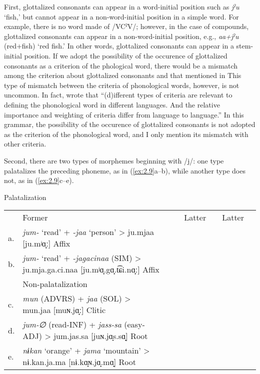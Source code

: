 First, glottalized consonants can appear in a word-initial position such as \textit{jˀu} ‘fish,’ but cannot appear in a non-word-initial position in a simple word. For example, there is no word made of /VCˀV/; however, in the case of compounds, glottalized consonants can appear in a non-word-initial position, e.g., \textit{aa+jˀu} (red+fish) ‘red fish.’ In other words, glottalized consonants can appear in a stem-initial position. If we adopt the possibility of the occurence of glottalized consonants as a criterion of the phological word, there would be a mismatch among the criterion about glottalized consonants and that mentioned in  This type of mismatch between the criteria of phonological words, however, is not uncommon. In fact, \citet[18]{DixonAikhenvald2002} wrote that “(d)ifferent types of criteria are relevant to defining the phonological word in different languages. And the relative importance and weighting of criteria differ from language to language.” In this grammar, the possibility of the occurence of glottalized consonants is not adopted as the criterion of the phonological word, and I only mention its mismatch with other criteria.

Second, there are two types of morphemes beginning with /j/: one type palatalizes the preceding phoneme, as in (\ref{ex:2.9}a--b), while another type does not, as in (\ref{ex:2.9}c--e).

\ea Palatalization\\\label{ex:2.9}
\begin{tabular}{lllllllll}
   &   \multicolumn{2}{l}{Former}  & &  \multicolumn{2}{l}{Latter}   & &   {Latter}\\
a. & {\itshape jum-}  {‘read’}  {+}  {\itshape {}-jaa}  {‘person’}  {>}  {ju.mjaa [ju.mʲɑ̟ː]}  {Affix}\\
b. & {\itshape jum-}  {‘read’}  {+}  {\itshape {}-jagacinaa}  {(SIM)}  {>}  {ju.mja.ga.ci.naa [ju.mʲɑ̟.gɑ̟.t͡ɕi.nɑ̟ː]}  {Affix}\medskip\\
   & \multicolumn{3}{l}{Non-palatalization} \\
c. & {\itshape mun}  {(ADVRS)}  {+}  {\itshape jaa}  {(SOL)}  {>}  {mun.jaa [muɴ.jɑ̟ː]}  {Clitic}\\
d. & {\itshape jum-∅}  {(read-INF)}  {+}  {\itshape jass-sa}  {(easy-ADJ)}  {>}  {jum.jas.sa [juɴ.jɑ̟s.sɑ̟]}  {Root}\\
e. & {\itshape nɨkan}  {‘orange’}  {+}  {\itshape jama}  {‘mountain’}  {>}  {nɨ.kan.ja.ma [nɨ.kɑ̟ɴ.jɑ̟.mɑ̟]}  {Root}\\
\end{tabular}
\z

